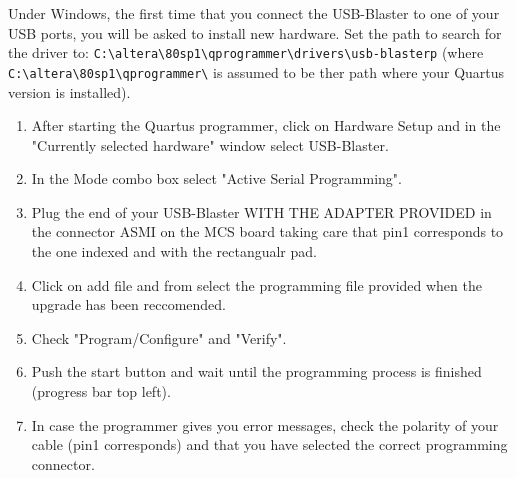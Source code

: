 \documentclass{article}
\begin{document}
\noindent Under Windows, the first time that you connect the USB-Blaster to one
of your USB ports, you will be asked to install new hardware. Set the path to
search for the driver to:
\verb=C:\altera\80sp1\qprogrammer\drivers\usb-blasterp= (where 
\verb=C:\altera\80sp1\qprogrammer\= is assumed to be ther path where your
Quartus version is installed).
\begin{enumerate}
\item After starting the Quartus programmer, click on Hardware Setup and in the
"Currently selected hardware" window select USB-Blaster.
\item In the Mode combo box select "Active Serial Programming".
\item Plug the end of your USB-Blaster WITH THE ADAPTER PROVIDED in the
connector ASMI on the MCS board taking care that pin1 corresponds to the one
indexed and with the rectangualr pad.
\item Click on add file and from select the programming file provided when
the upgrade has been reccomended.
\item Check "Program/Configure" and "Verify".
\item Push the start button and wait until the programming process is
finished (progress bar top left).
\item In case the programmer gives you error messages, check the polarity of
your cable (pin1 corresponds) and that you have selected the correct programming
connector.
\end{enumerate}
\end{document}
